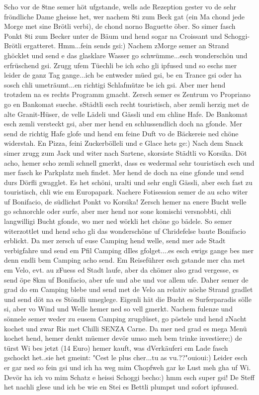 Scho vor de 8tne semer höt ufgstande, wells ade Rezeption gester vo de sehr fröndliche Dame gheisse het, wer nachem 8ti zum Beck gat (ein Ma chond jede Morge met sine Brötli verbi), de chond norno Baguette öber. So simer fasch Ponkt 8ti zum Becker unter de Bäum und hend sogar na Croissant und Schoggi-Brötli ergatteret. Hmm...fein sends gsi:) Nachem zMorge semer an Strand ghöcklet und send e das glasklare Wasser go schwümme...esch wonderschön und erfrüschend gsi. Zrugg ufem Tüechli be ich scho gli ipfused und so eschs mer leider de ganz Tag gange...ich be entweder müed gsi, be en Trance gsi oder ha sosch chli umeträumt...en richtigi Schlafmütze be ich gsi. Aber mer hend trotzdem na es rechts Programm gmacht. Zersch semer es Zentrum vo Propriano go en Bankomat sueche. sStädtli esch recht touristisch, aber zemli herzig met de alte Granit-Hüser, de velle Lädeli und Gässli und em chline Hafe. De Bankomat esch zemli versteckt gsi, aber mer hend en schlussendlich doch na gfonde. Mer send de richtig Hafe glofe und hend em feine Duft vo de Bäckereie ned chöne widerstah. En Pizza, feini Zuckerbölleli und e Glace hets ge:) Nach dem Snack simer zrugg zum Jack und witer nach Sartene, skorsiste Städtli vo Korsika. Döt acho, hemer scho zemli schnell gmerkt, dass es wedermal sehr touristisch esch und mer fasch ke Parkplatz meh findet. Mer hend de doch na eine gfonde und send durs Dörfli gwagglet. Es het schöni, uralti und sehr engli Gässli, aber esch fast zu touristisch, chli wie em Europapark. Nachere Fotisession semer de au scho witer uf Bonifacio, de südlichst Ponkt vo Korsika! Zersch hemer na enere Bucht welle go schnorchle oder surfe, aber mer hend nor sone komischi versnobbti, chli langwilligi Bucht gfonde, wo mer ned wörkli het chöne go bädele. So semer witerzottlet und hend scho gli das wonderschöne uf Chridefelse baute Bonifacio erblickt. Da mer zersch uf euse Camping hend welle, send mer ade Stadt verbigfahre und send em Pfil Camping dIles gfolget....es esch ewigs gange bes mer denn endli bem Camping acho send. Em Reiseführer esch gstande mer cha met em Velo, evt. au zFuess ed Stadt laufe, aber da chömer also grad vergesse, es send öpe 8km uf Bonifacio, aber ufe und abe und vor allem ufe. Daher semer de grad do em Camping blebe und send met de Velo an relativ nöche Strand gradlet und send döt na es Stöndli umeglege. Eigenli hät die Bucht es Surferparadis sölle si, aber vo Wind und Welle hemer ned so vell gmerkt. Nachem fulenze und sönnele semer weder zu eusem Camping zrugdüset, go pöstele und hend zNacht kochet und zwar Ris met Chilli SENZA Carne. Da mer ned grad es mega Menü kochet hend, hemer denkt müemer devör umso meh bem trinke investiere;) de türst Wi bes jetzt (14 Euro) hemer kauft, was dVerkäuferi em Lade fasch gschockt het..sie het gmeint: "Cest le plus cher...tu as vu.??"ouioui:) Leider esch er gar ned so fein gsi und ich ha weg mim Chopfweh gar ke Lust meh gha uf Wi. Devör ha ich vo mim Schatz e heissi Schoggi becho:) hmm esch super gsi! De Steff het nachli glese und ich be wie en Stei es Bettli plumpst und sofort ipfuused.

